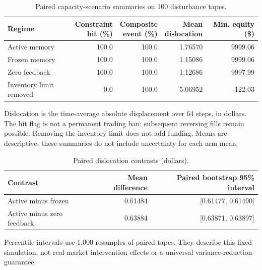 \begin{table}[htbp]\centering\small
\caption{Paired capacity-scenario summaries on 100 disturbance tapes.}
\label{tab:funded_controls}
\begin{tabular*}{\textwidth}{@{\extracolsep{\fill}}lrrrr@{}}
\toprule
Regime & \shortstack{Constraint\\hit (\%)} & \shortstack{Composite\\event (\%)} & \shortstack{Mean\\dislocation} & \shortstack{Min. equity\\(\$)} \\
\midrule
Active memory & 100.0 & 100.0 & 1.76570 & 9999.06 \\
Frozen memory & 100.0 & 100.0 & 1.15086 & 9999.06 \\
Zero feedback & 100.0 & 100.0 & 1.12686 & 9997.99 \\
Inventory limit removed & 0.0 & 100.0 & 5.06952 & -122.03 \\
\bottomrule\end{tabular*}
\par\smallskip\begin{minipage}{\textwidth}\footnotesize Dislocation is the time-average absolute displacement over 64 steps, in dollars. The hit flag is not a permanent trading ban: subsequent reversing fills remain possible. Removing the inventory limit does not add funding. Means are descriptive; these summaries do not include uncertainty for each arm mean.\end{minipage}
\end{table}
\begin{table}[htbp]\centering\small
\caption{Paired dislocation contrasts (dollars).}
\label{tab:funded_paired_contrasts}
\begin{tabular*}{\textwidth}{@{\extracolsep{\fill}}lrr@{}}
\toprule
Contrast & Mean difference & Paired bootstrap 95\% interval \\
\midrule
Active minus frozen & 0.61484 & [0.61477, 0.61490] \\
Active minus zero feedback & 0.63884 & [0.63871, 0.63897] \\
\bottomrule\end{tabular*}
\par\smallskip\begin{minipage}{\textwidth}\footnotesize Percentile intervals use 1,000 resamples of paired tapes. They describe this fixed simulation, not real-market intervention effects or a universal variance-reduction guarantee.\end{minipage}
\end{table}
